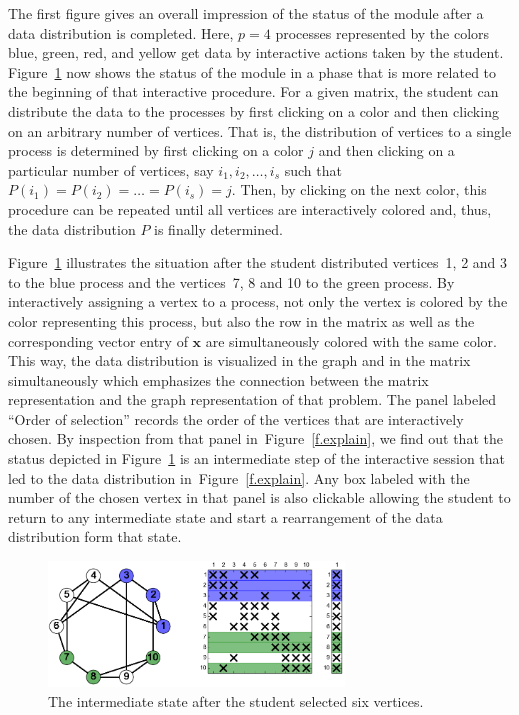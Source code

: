 \documentclass[11pt, twoside,a4paper]{book}
\newcommand{\vek}[1]{{\ensuremath{\mathbf #1}}}
\newcommand{\figref}[1]{Figure~\protect\ref{#1}}
\begin{document}
The first figure gives an overall impression of the status of the module after a data
distribution is completed. Here, $p=4$ processes represented by the colors blue, green,
red, and yellow get data by interactive actions taken by the student.
Figure~\ref{f.beginning} now shows the status of the module in a phase that is more
related to the beginning of that interactive procedure. For a given matrix, the student
can distribute the data to the processes by first clicking on a color and then clicking
on an arbitrary number of vertices. That is, the distribution of vertices to a single
process is determined by first clicking on a color $j$ and then clicking on a particular
number of vertices, say $i_1, i_2, \dots, i_s$ such that $P(i_1) = P(i_2) = \dots =
P(i_s) = j$. Then, by clicking on the next color, this procedure can be repeated until
all vertices are interactively colored and, thus, the data distribution $P$ is finally
determined.

Figure~\ref{f.beginning} illustrates the situation after the student distributed
vertices~1, 2 and 3 to the blue process and the vertices~7, 8 and 10 to the green
process. By interactively assigning a vertex to a process, not only the vertex is colored
by the color representing this process, but also the row in the matrix as well as the
corresponding vector entry of \vek{x} are simultaneously colored with the same color.
This way, the data distribution is visualized in the graph and in the matrix
simultaneously which emphasizes the connection between the matrix representation and the
graph representation of that problem. The panel labeled ``Order of selection'' records
the order of the vertices that are interactively chosen. By inspection from that panel
in~\figref{f.explain}, we find out that the status depicted in \figref{f.beginning} is an
intermediate step of the interactive session that led to the data distribution
in~\figref{f.explain}. Any box labeled with the number of the chosen vertex in that panel
is also clickable allowing the student to return to any intermediate state and start a
rearrangement of the data distribution form that state.


\begin{figure}
\centering
\includegraphics[width=0.7\textwidth]{twoColors}
\caption{The intermediate state after the student selected six vertices.}
\label{f.beginning}
\end{figure}
\end{document}
